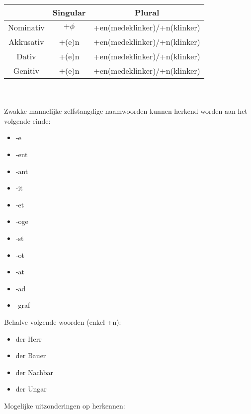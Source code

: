 \documentclass[main.tex]{subfiles}
\begin{document}
\begin{minipage}[t]{0.70\textwidth}
\begin{tabular}{|c|c|c|}
\hline 
\rowcolor{gray}
& Singular & Plural \\ 
\hline 
\cellcolor[gray]{0.8}Nominativ & $+\phi$ & +en(medeklinker)/+n(klinker)\\ 
\hline 
\cellcolor[gray]{0.8}Akkusativ & +(e)n & +en(medeklinker)/+n(klinker)\\ 
\hline 
\cellcolor[gray]{0.8}Dativ & +(e)n & +en(medeklinker)/+n(klinker)\\ 
\hline 
\cellcolor[gray]{0.8}Genitiv & +(e)n & +en(medeklinker)/+n(klinker)\\ 
\hline 
\end{tabular} 
\\
\\
Zwakke mannelijke zelfstangdige naamwoorden kunnen herkend worden aan het volgende einde:
\begin{itemize}
\item -e
\item -ent
\item -ant
\item -it
\item -et
\item -oge
\item -st
\item -ot
\item -at
\item -ad
\item -graf
\end{itemize}
\end{minipage}
\begin{minipage}[t]{0.3\textwidth}
Behalve volgende woorden (enkel +n):
\begin{itemize}
\item der Herr
\item der Bauer
\item der Nachbar
\item der Ungar
\end{itemize}
Mogelijke uitzonderingen op herkennen:
\end{minipage}
\end{document}
